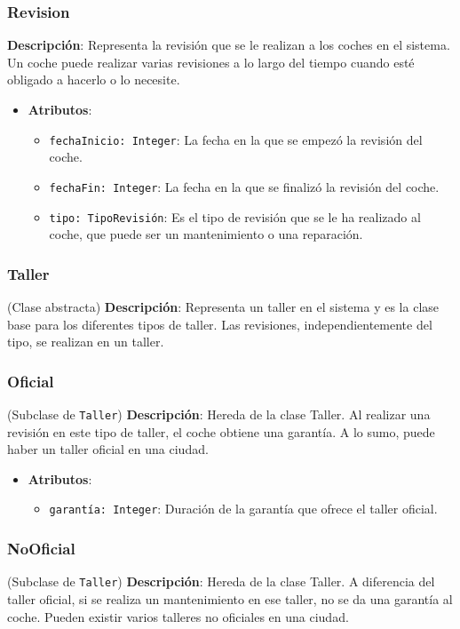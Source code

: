 \documentclass[12pt.a4paper]{article}
\begin{document}
\subsubsection{Revision}
\textbf{Descripción}: Representa la revisión que se le realizan a los coches en el sistema. Un coche puede realizar varias revisiones a lo largo del tiempo cuando esté obligado a hacerlo o lo necesite.
\begin{itemize}
    \item \textbf{Atributos}:
    \begin{itemize}
        \item \texttt{fechaInicio: Integer}: La fecha en la que se empezó la revisión del coche.
        \item \texttt{fechaFin: Integer}: La fecha en la que se finalizó la revisión del coche.
        \item \texttt{tipo: TipoRevisión}: Es el tipo de revisión que se le ha realizado al coche, que puede ser un mantenimiento o una reparación.
    \end{itemize}
\end{itemize}

\subsubsection{Taller} (Clase abstracta)
\textbf{Descripción}:  Representa un taller en el sistema y es la clase base para los diferentes tipos de taller. Las revisiones, independientemente del tipo, se realizan en un taller. 

\subsubsection{Oficial} (Subclase de \texttt{Taller})
\textbf{Descripción}:  Hereda de la clase Taller. Al realizar una revisión en este tipo de taller, el coche obtiene una garantía. A lo sumo, puede haber un taller oficial en una ciudad.
\begin{itemize}
    \item \textbf{Atributos}:
    \begin{itemize}
        \item \texttt{garantía: Integer}: Duración de la garantía que ofrece el taller oficial.
    \end{itemize}
\end{itemize}

\subsubsection{NoOficial} (Subclase de \texttt{Taller})
\textbf{Descripción}:  Hereda de la clase Taller. A diferencia del taller oficial, si se realiza un mantenimiento en ese taller, no se da una garantía al coche. Pueden existir varios talleres no oficiales en una ciudad.
\end{document}
